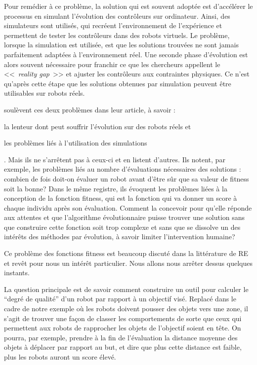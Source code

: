 Pour remédier à ce problème, la solution qui est souvent adoptée est d'accélérer le processus en simulant l'évolution des contrôleurs sur ordinateur. Ainsi, des simulateurs sont utilisés, qui recréent l'environnement de l'expérience et permettent de tester les contrôleurs dans des robots virtuels. Le problème, lorsque la simulation est utilisée, est que les solutions trouvées ne sont jamais parfaitement adaptées à l'environnement réel. Une seconde phase d'évolution est alors souvent nécessaire pour franchir ce que les chercheurs appellent le <<~\emph{reality gap}~>> et ajuster les contrôleurs aux contraintes physiques. Ce n'est qu'après cette étape que les solutions obtenues par simulation peuvent être utilisables sur robots réels.

\cite{mataric96challengesinevolvingcontrollersforphysicalrobots} soulèvent ces deux problèmes dans leur article, à savoir :

\begin{inparaenum}
\item la lenteur dont peut souffrir l'évolution sur des robots réels et
\item les problèmes liés à l'utilisation des simulations
\end{inparaenum}. Mais ils ne s'arrêtent pas à ceux-ci et en listent d'autres. Ils notent, par exemple, les problèmes liés au nombre d'évaluations nécessaires des solutions : combien de fois doit-on évaluer un robot avant d'être sûr que sa valeur de fitness soit la bonne? Dans le même registre, ils évoquent les problèmes liées à la conception de la fonction fitness, qui est la fonction qui va donner un score à chaque individu après son évaluation. Comment la concevoir pour qu'elle réponde aux attentes et que l'algorithme évolutionnaire puisse trouver une solution sans que construire cette fonction soit trop complexe et sans que se dissolve un des intérêts des méthodes par évolution, à savoir limiter l'intervention humaine?

Ce problème des fonctions fitness est beaucoup discuté dans la littérature de RE et revêt pour nous un intérêt particulier. Nous allons nous arrêter dessus quelques instants.

La question principale est de savoir comment construire un outil pour calculer le ``degré de qualité'' d'un robot par rapport à un objectif visé. Replacé dans le cadre de notre exemple où les robots doivent pousser des objets vers une zone, il s'agit de trouver une façon de classer les comportements de sorte que ceux qui permettent aux robots de rapprocher les objets de l'objectif soient en tête. On pourra, par exemple, prendre à la fin de l'évaluation la distance moyenne des objets à déplacer par rapport au but, et dire que plus cette distance est faible, plus les robots auront un score élevé.

